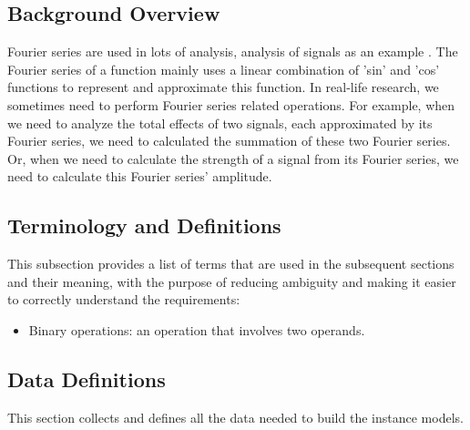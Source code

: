 \documentclass[12pt]{article}
\begin{document}
\subsection{Background Overview} \label{Sbsc:CA-Background}
Fourier series are used in lots of analysis, analysis of signals as an example 
\cite{papoulis1977signal}. The Fourier series of a function mainly uses 
a linear combination of 'sin' and 'cos' functions to represent and approximate 
this function. In real-life research, we sometimes need to perform Fourier 
series related operations. For example, when we need to analyze the total 
effects of two signals, each approximated by its Fourier series, 
we need to calculated the summation of these two Fourier series. 
Or, when we need to calculate the strength of a signal from its Fourier 
series, we need to calculate this Fourier series' amplitude.
\subsection{Terminology and Definitions}

This subsection provides a list of terms that are used in the subsequent
sections and their meaning, with the purpose of reducing ambiguity and making it
easier to correctly understand the requirements:

\begin{itemize}

\item Binary operations: an operation that involves two operands.

\end{itemize}
\subsection{Data Definitions} \label{sec_datadef}

This section collects and defines all the data needed to build the instance
models.
~\newline
\end{document}
